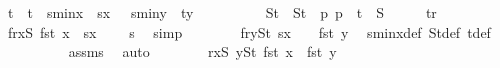 \begin{isabellebody}
\ t\ \ {\isachardoublequoteopen}t\ {\isacharequal}{\kern0pt}\ {\isacharparenleft}{\kern0pt}{\isacharminus}{\kern0pt}s{}{\isacharunderscore}{\kern0pt}minx\ {\isacharplus}{\kern0pt}\ s{}x\ {\isacharplus}{\kern0pt}\ {}{\isacharcomma}{\kern0pt}\ {\isacharminus}{\kern0pt}s{}{\isacharunderscore}{\kern0pt}miny\ {\isacharplus}{\kern0pt}\ ty{}\ {\isacharplus}{\kern0pt}\ {}{\isacharparenright}{\kern0pt}{\isachardoublequoteclose}\isanewline
\ \ \ \ \ \ \isamarkupfalse%
\ S{}t\ \ {\isachardoublequoteopen}S{}t\ {\isacharequal}{\kern0pt}\ {\isacharparenleft}{\kern0pt}{\isasymlambda}p{\isachardot}{\kern0pt}\ p\ {\isacharplus}{\kern0pt}\ t{\isacharparenright}{\kern0pt}\ {\isacharbackquote}{\kern0pt}\ S{}{\isachardoublequoteclose}\ \ \ {\isacharparenleft}{\kern0pt}\ {\isachardoublequoteopen}{\isacharunderscore}{\kern0pt}\ {\isacharequal}{\kern0pt}\ {\isacharquery}{\kern0pt}tr\ {\isacharbackquote}{\kern0pt}\ {\isacharunderscore}{\kern0pt}{\isachardoublequoteclose}{\isacharparenright}{\kern0pt}\isanewline
\isanewline
\ \ \ \ \ \ \isamarkupfalse%
\ f{}r{}{\isacharcolon}{\kern0pt}{\isachardoublequoteopen}{\isasymforall}x{\isasymin}S{}{\isachardot}{\kern0pt}\ fst\ x\ {\isacharless}{\kern0pt}\ s{}x\ {\isacharplus}{\kern0pt}\ {}{\isachardoublequoteclose}\ \isamarkupfalse%
\ s{}\ \isamarkupfalse%
\ simp\isanewline
\ \ \ \ \ \ \isamarkupfalse%
\ f{}r{}{\isacharcolon}{\kern0pt}{\isachardoublequoteopen}{\isasymforall}y{\isasymin}S{}t{\isachardot}{\kern0pt}\ s{}x\ {\isacharplus}{\kern0pt}\ {}\ {\isasymle}\ fst\ y{\isachardoublequoteclose}\ \isamarkupfalse%
\ s{}{\isacharunderscore}{\kern0pt}minx{\isacharunderscore}{\kern0pt}def\ S{}t{\isacharunderscore}{\kern0pt}def\ t{\isacharunderscore}{\kern0pt}def\isanewline
\ \ \ \ \ \ \ \ \isamarkupfalse%
\ assms{\isacharparenleft}{\kern0pt}{}{\isacharparenright}{\kern0pt}\ \isamarkupfalse%
\ auto\isanewline
\ \ \ \ \ \ \isamarkupfalse%
\ r{}{\isacharcolon}{\kern0pt}{\isachardoublequoteopen}{\isacharparenleft}{\kern0pt}{\isasymforall}x{\isasymin}S{}{\isachardot}{\kern0pt}\ {\isasymforall}y{\isasymin}S{}t{\isachardot}{\kern0pt}\ fst\ x\ {\isacharless}{\kern0pt}\ fst\ y{\isacharparenright}{\kern0pt}{\isachardoublequoteclose}\ \isamarkupfalse%

\end{isabellebody}
